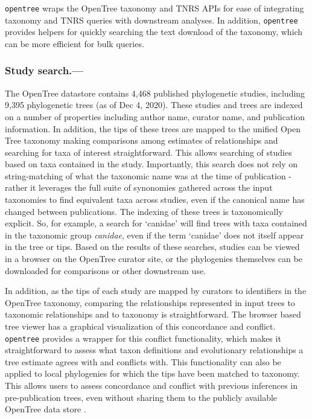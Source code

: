 \documentclass[oupdraft]{sysbio_sse}
\begin{document}
\texttt{opentree} wraps the OpenTree taxonomy and TNRS APIs for ease of integrating taxonomy and TNRS queries with downstream analyses. In addition, \texttt{opentree} provides helpers for quickly searching the text download of the taxonomy, which can be more efficient for bulk queries.


\subsubsection{Study search.---} The OpenTree datastore contains 4,468 published phylogenetic studies, including 9,395 phylogenetic trees (as of Dec 4, 2020).
These studies and trees are indexed on a number of properties including author name, curator name, and publication information. 
In addition, the tips of these trees are mapped to the unified Open Tree taxonomy making comparisons among estimates of relationships and searching for taxa of interest straightforward.
This allows searching of studies based on taxa contained in the study.
Importantly, this search does not rely on string-matching of what the taxonomic name was at the time of publication - rather it leverages the full suite of synonomies gathered across the input taxonomies to find equivalent taxa across studies, even if the canonical name has changed between publications.
The indexing of these trees is taxonomically explicit.
So, for example, a search for `canidae' will find trees with taxa contained in the taxonomic group \textit{canidae}, even if the term `canidae' does not itself appear in the tree or tips.
Based on the results of these searches, studies can be viewed in a browser on the OpenTree curator site, or the phylogenies themselves can be downloaded for comparisons or other downstream use.

In addition, as the tips of each study are mapped by curators to identifiers in the OpenTree taxonomy, comparing the relationships represented in input trees to taxonomic relationships and to taxonomy is straightforward. The browser based tree viewer has a graphical visualization of this concordance and conflict. \texttt{opentree} provides a wrapper for this conflict functionality, which makes it straightforward to assess what taxon definitions and evolutionary relationships a tree estimate agrees with and conflicts with. This functionality can also be applied to local phylogenies for which the tips have been matched to taxonomy. This allows users to assess concordance and conflict with previous inferences in pre-publication trees, even without sharing them to the publicly available OpenTree data store \citep{reyes_physcraper_2020, mctavish_phylesystem_2015}.
\end{document}
